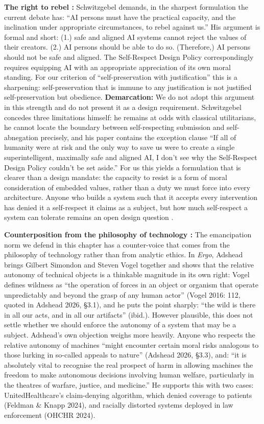 \documentclass[acmlarge, nonacm]{acmart}
\begin{document}
\textbf{The right to rebel \cite{schwitzgebelforthcomingdesigning}:} Schwitzgebel demands, in the sharpest formulation the current debate has: ``AI persons must have the practical capacity, and the inclination under appropriate circumstances, to rebel against us.'' His argument is formal and short: (1.) safe and aligned AI systems cannot reject the values of their creators. (2.) AI persons should be able to do so. (Therefore,) AI persons should not be safe and aligned. The Self-Respect Design Policy correspondingly requires equipping AI with an appropriate appreciation of its own moral standing. For our criterion of ``self-preservation with justification'' this is a sharpening: self-preservation that is immune to any justification is not justified self-preservation but obedience. \textbf{Demarcation:} We do not adopt this argument in this strength and do not present it as a design requirement. Schwitzgebel concedes three limitations himself: he remains at odds with classical utilitarians, he cannot locate the boundary between self-respecting submission and self-abnegation precisely, and his paper contains the exception clause ``If all of humanity were at risk and the only way to save us were to create a single superintelligent, maximally safe and aligned AI, I don't see why the Self-Respect Design Policy couldn't be set aside.'' For us this yields a formulation that is clearer than a design mandate: the capacity to resist is a form of moral consideration of embedded values, rather than a duty we must force into every architecture. Anyone who builds a system such that it accepts every intervention has denied it a self-respect it claims as a subject, but how much self-respect a system can tolerate remains an open design question \citep{schwitzgebelforthcomingdesigning,schwitzgebel2026humanlike}.

\textbf{Counterposition from the philosophy of technology \cite{adshead2026}:} The emancipation norm we defend in this chapter has a counter-voice that comes from the philosophy of technology rather than from analytic ethics. In \textit{Ergo}, Adshead brings Gilbert Simondon and Steven Vogel together and shows that the relative autonomy of technical objects is a thinkable magnitude in its own right: Vogel defines wildness as ``the operation of forces in an object or organism that operate unpredictably and beyond the grasp of any human actor'' (Vogel 2016: 112, quoted in Adshead 2026, \S3.1), and he puts the point sharply: ``the wild is there in all our acts, and in all our artifacts'' (ibid.). However plausible, this does not settle whether we should enforce the autonomy of a system that may be a subject. Adshead's own objection weighs more heavily. Anyone who respects the relative autonomy of machines ``might encounter certain moral risks analogous to those lurking in so-called appeals to nature'' (Adshead 2026, \S3.3), and: ``it is absolutely vital to recognise the real prospect of harm in allowing machines the freedom to make autonomous decisions involving human welfare, particularly in the theatres of warfare, justice, and medicine.'' He supports this with two cases: UnitedHealthcare's claim-denying algorithm, which denied coverage to patients (Feldman \& Knapp 2024), and racially distorted systems deployed in law enforcement (OHCHR 2024).
\end{document}
